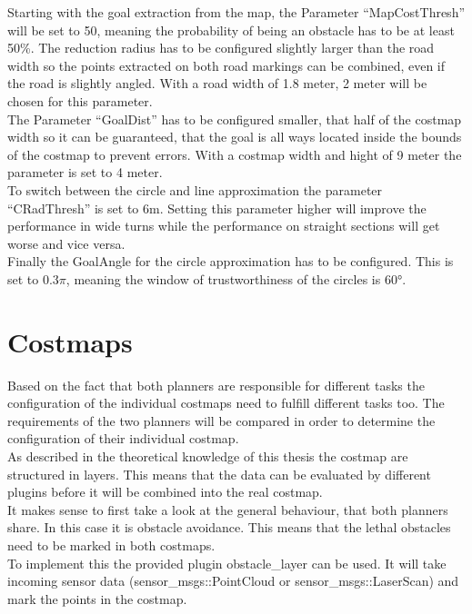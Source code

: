 Starting with the goal extraction from the map, the Parameter ``MapCostThresh'' will be set to 50, meaning the probability of being an obstacle has to be at least 50\%. The reduction radius has to be configured slightly larger than the road width so the points extracted on both road markings can be combined, even if the road is slightly angled. With a road width of 1.8 meter, 2 meter will be chosen for this parameter.\\

The Parameter ``GoalDist'' has to be configured smaller, that half of the costmap width so it can be guaranteed, that the goal is all ways located inside the bounds of the costmap to prevent errors. With a costmap width and hight of 9 meter the parameter is set to 4 meter.\\

To switch between the circle and line approximation the parameter ``CRadThresh'' is set to 6m. Setting this parameter higher will improve the performance in wide turns while the performance on straight sections will get worse and vice versa.\\

Finally the GoalAngle for the circle approximation has to be configured. This is set to $0.3\pi$, meaning the window of trustworthiness of the circles is 60°.




\section{Costmaps}
Based on the fact that both planners are responsible for different tasks the configuration of the individual costmaps need to fulfill different tasks too. The requirements of the two planners will be compared in order to determine the configuration of their individual costmap.\\

As described in the theoretical knowledge of this thesis the costmap are structured in layers. This means that the data can be evaluated by different plugins before it will be combined into the real costmap.\\

It makes sense to first take a look at the general behaviour, that both planners share. In this case it is obstacle avoidance. This means that the lethal obstacles need to be marked in both costmaps.\\

To implement this the provided plugin obstacle\_layer can be used. It will take incoming sensor data (sensor\_msgs::PointCloud or sensor\_msgs::LaserScan) and mark the points in the costmap.\\

